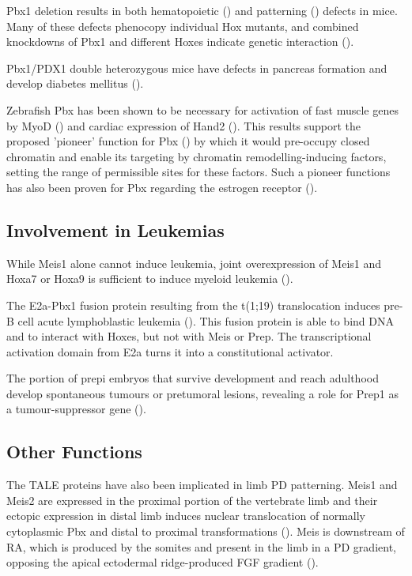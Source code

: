 Pbx1 deletion results in both hematopoietic (\cite{DiMartino2001}) and patterning (\cite{Selleri2001, Moens2006}) defects in mice. Many of these defects phenocopy individual Hox mutants, and combined knockdowns of Pbx1 and different Hoxes indicate genetic interaction (\cite{Moens2006}).

Pbx1/PDX1 double heterozygous mice have defects in pancreas formation and develop diabetes mellitus (\cite{Kim2002}). 

Zebrafish Pbx has been shown to be necessary for activation of fast muscle genes by MyoD (\cite{Maves2007}) and cardiac expression of Hand2 (\cite{Maves2009}). This results support the proposed 'pioneer' function for Pbx (\cite{Berkes2004}) by which it would pre-occupy closed chromatin and enable its targeting by chromatin remodelling-inducing factors, setting the range of permissible sites for these factors. Such a pioneer functions has also been proven for Pbx regarding the estrogen receptor (\cite{Magnani2011}). %

\subsection{Involvement in Leukemias}

While Meis1 alone cannot induce leukemia, joint overexpression of Meis1 and Hoxa7 or Hoxa9 is sufficient to induce myeloid leukemia (\cite{Nakamura1996, Schnabel2000}).

The E2a-Pbx1 fusion protein resulting from the t(1;19) translocation induces pre-B cell acute lymphoblastic leukemia (\cite{Kamps1990}). This fusion protein is able to bind DNA and to interact with Hoxes, but not with Meis or Prep. The transcriptional activation domain from E2a turns it into a constitutional activator. 

The portion of \ac{prepi} embryos that survive development and reach adulthood develop spontaneous tumours or pretumoral lesions, revealing a role for Prep1 as a tumour-suppressor gene (\cite{Longobardi2010}).

\subsection{Other Functions}

The \ac{TALE} proteins have also been implicated in limb \ac{PD} patterning. Meis1 and Meis2 are expressed in the proximal portion of the vertebrate limb and their ectopic expression in distal limb induces nuclear translocation of normally cytoplasmic Pbx and distal to proximal transformations (\cite{Mercader1999b}). Meis is downstream of \ac{RA}, which is produced by the somites and present in the limb in a \ac{PD} gradient, opposing the apical ectodermal ridge-produced FGF gradient (\cite{Mercader2000, Rosello-Diez2011}).

